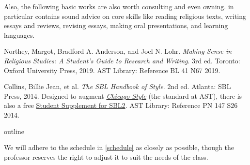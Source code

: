 \documentclass[titlepage]{article}
\begin{document}
Also, the following basic works are also worth consulting and even owning.
\cite{rlgs} in particular contains sound advice on core skills like
reading religious texts, writing essays and reviews, revising essays,
making oral presentations, and learning languages.

\begingroup
\renewcommand{\section}[2]{}%
\begin{thebibliography}{Making}%

	 Northey, Margot, Bradford A. Anderson, and Joel N. Lohr.
	\emph{Making Sense in Religious Studies: A Student's Guide to Research and Writing}.
	3rd ed. Toronto: Oxford University Press, 2019. AST Library: Reference BL 41 N67 2019.

	 Collins, Billie Jean, et al.
	\emph{The SBL Handbook of Style}.
	2nd ed. Atlanta: SBL Press, 2014.
	Designed to augment \href{https://proxy.openathens.net/login?qurl=https%3A%2F%2Fwww.chicagomanualofstyle.org%2Fbook%2Fed17%2Ffrontmatter%2Ftoc.html}{\emph{Chicago Style}}
	(the standard at AST), there is also a free
	\href{https://www.sbl-site.org/assets/pdfs/pubs/SBLHSsupp2015-02.pdf}{Student Supplement for SBL2}. AST Library: Reference PN 147 S26 2014.

\end{thebibliography}
\endgroup

\section{Course Outline}
\label{outline}

We will adhere to the schedule in \autoref{schedule} as closely as
possible, though the professor reserves the right to adjust it to suit
the needs of the class.
\end{document}
